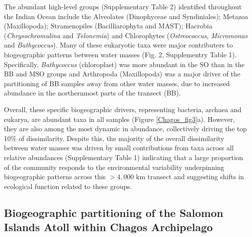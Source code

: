 The abundant high-level groups (Supplementary Table 2) identified throughout the Indian Ocean include the Alveolates (Dinophyceae and Syndiniales); Metazoa (Maxillopoda); Stramenopiles (Bacilliarophyta and MAST); Hacrobia ({\em Chrysochromulina} and {\em Telonemia}) and Chlorophytes ({\em Ostreococcus}, {\em Micromonas} and {\em Bathycoccus}). Many of these eukaryotic taxa were major contributers to biogeographic patterns between water masses (Fig. 2, Supplementry Table 1). Specifically, {\em Bathycoccus} (chloroplast) was more abundant in the SO than in the BB and MSO groups and Arthropoda (Maxillopoda) was a major driver of the partitioning of BB samples away from other water masses, due to increased abundance in the northernmost parts of the transect (BB).

Overall, these specific biogeographic drivers, representing bacteria, archaea and eukarya, are abundant taxa in all samples (Figure \ref{Chagos_fig3}a). However, they are also among the most dynamic in abundance, collectively driving the top 10\% of dissimilarity. Despite this, the majority of the overall dissimilarity between water masses was driven by small contributions from taxa across all relative abundances (Supplementary Table 1) indicating that a large proportion of the community responds to the environmental variability underpinning biogeographic patterns across this $>4,000$ km transect and suggesting shifts in ecological function related to these groups.

\subsection{Biogeographic partitioning of the Salomon Islands Atoll within Chagos Archipelago}

